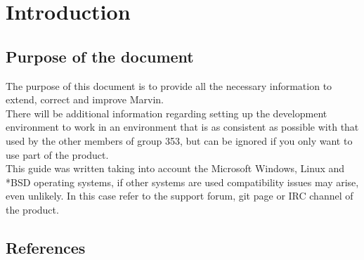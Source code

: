 \documentclass[ManualeSviluppatore]{subfiles}
\begin{document}
\chapter{Introduction}

	\section{Purpose of the document}
	The purpose of this document is to provide all the necessary information to extend, correct and improve Marvin. \\
	There will be additional information regarding setting up the development environment to work in an environment that is as consistent as possible with that used by the other members of group 353, but can be ignored if you only want to use part of the product. \\
	This guide was written taking into account the Microsoft Windows, Linux and *BSD operating systems, if other systems are used compatibility issues may arise, even unlikely. In this case refer to the support forum, git page or IRC channel of the product.
	
	\scopoProdottoEN
	
	\section{References}
\end{document}
